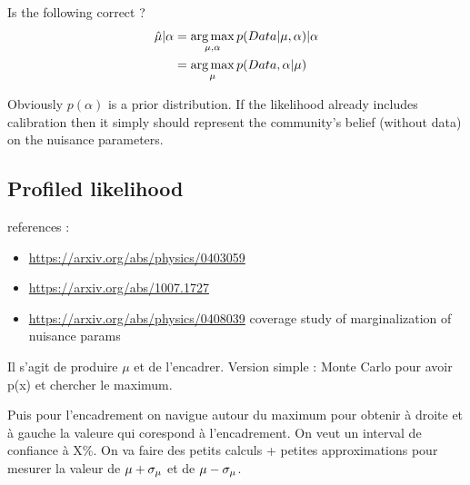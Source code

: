 Is the following correct ?
\begin{align}
	\hat\mu | \alpha &= \operatorname*{arg\,max}_{\mu, \alpha} p(Data | \mu, \alpha) | \alpha \\
		&= \operatorname*{arg\,max}_{\mu} p(Data , \alpha | \mu)
\end{align}

Obviously $p(\alpha)$ is a prior distribution.
If the likelihood already includes calibration then it simply should represent the community's belief (without data) on the nuisance parameters.





\subsection{Profiled likelihood} %
\label{sub:profiled_likelihood}




references : 
\begin{itemize}
	\item \url{https://arxiv.org/abs/physics/0403059}
	\item \url{https://arxiv.org/abs/1007.1727}
	\item \url{https://arxiv.org/abs/physics/0408039} coverage study of marginalization of nuisance params
\end{itemize}




Il s'agit de produire $\mu$ et de l'encadrer.
Version simple : Monte Carlo pour avoir p(x) et chercher le maximum.

Puis pour l'encadrement on navigue autour du maximum pour obtenir à droite et à gauche la valeure qui corespond à l'encadrement.
On veut un interval de confiance à X\%.
On va faire des petits calculs + petites approximations pour mesurer la valeur de $\mu + \sigma_\mu$ et de $\mu - \sigma_\mu$.








